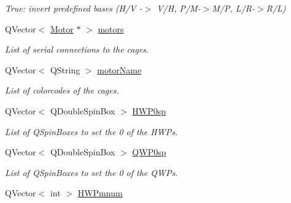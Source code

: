 \begin{DoxyCompactItemize}
\begin{DoxyCompactList}\small\item\em True\+: invert predefined bases (H/V -\/$>$ V/H, P/\+M-\/$>$M/P, L/\+R-\/$>$R/L) \end{DoxyCompactList}\item 
\mbox{\label{classcagecontrol_a8c4968b6ced27c21dafbc9c804e96ba0}} 
Q\+Vector$<$ \hyperlink{classMotor}{Motor} $\ast$ $>$ \hyperlink{classcagecontrol_a8c4968b6ced27c21dafbc9c804e96ba0}{motors}
\begin{DoxyCompactList}\small\item\em List of serial connections to the cages. \end{DoxyCompactList}\item 
\mbox{\label{classcagecontrol_a8e87cb65e7cd3b01bb35709ee62e5226}} 
Q\+Vector$<$ Q\+String $>$ \hyperlink{classcagecontrol_a8e87cb65e7cd3b01bb35709ee62e5226}{motor\+Name}
\begin{DoxyCompactList}\small\item\em List of colorcodes of the cages. \end{DoxyCompactList}\item 
\mbox{\label{classcagecontrol_a5af27745d1d9e0b9411d8445f5648e74}} 
Q\+Vector$<$ Q\+Double\+Spin\+Box $>$ \hyperlink{classcagecontrol_a5af27745d1d9e0b9411d8445f5648e74}{H\+W\+P0sp}
\begin{DoxyCompactList}\small\item\em List of Q\+Spin\+Boxes to set the \textquotesingle{}0\textquotesingle{} of the H\+W\+Ps. \end{DoxyCompactList}\item 
\mbox{\label{classcagecontrol_a026cbda0584d3b18cab5c30fec167ce2}} 
Q\+Vector$<$ Q\+Double\+Spin\+Box $>$ \hyperlink{classcagecontrol_a026cbda0584d3b18cab5c30fec167ce2}{Q\+W\+P0sp}
\begin{DoxyCompactList}\small\item\em List of Q\+Spin\+Boxes to set the \textquotesingle{}0\textquotesingle{} of the Q\+W\+Ps. \end{DoxyCompactList}\item 
\mbox{\label{classcagecontrol_a2ed383394220bea867589a6e7939156f}} 
Q\+Vector$<$ int $>$ \hyperlink{classcagecontrol_a2ed383394220bea867589a6e7939156f}{H\+W\+Pmnum}

\end{DoxyCompactItemize}
